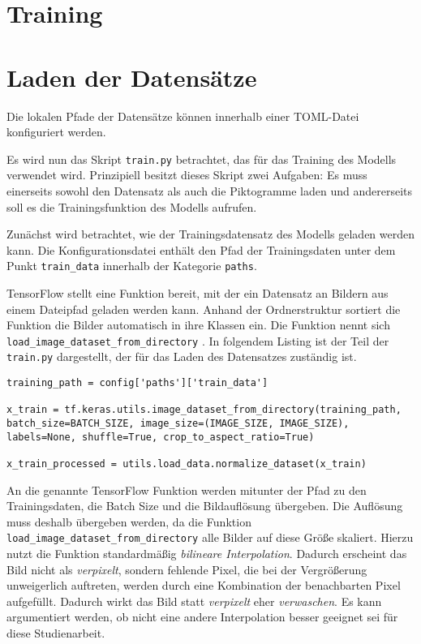 \section{Training}

\section{Laden der Datensätze}
Die lokalen Pfade der Datensätze können innerhalb einer \ac{TOML}-Datei konfiguriert werden. 


Es wird nun das Skript \lstinline{train.py} betrachtet, das für das Training des Modells verwendet wird. Prinzipiell besitzt dieses Skript zwei Aufgaben: Es muss einerseits sowohl den Datensatz als auch die Piktogramme laden und andererseits soll es die Trainingsfunktion des Modells aufrufen.

Zunächst wird betrachtet, wie der Trainingsdatensatz des Modells geladen werden kann. Die Konfigurationsdatei enthält den Pfad der Trainingsdaten unter dem Punkt \lstinline{train_data} innerhalb der Kategorie \lstinline{paths}.

TensorFlow stellt eine Funktion bereit, mit der ein Datensatz an Bildern aus einem Dateipfad geladen werden kann. Anhand der Ordnerstruktur sortiert die Funktion die Bilder automatisch in ihre Klassen ein. Die Funktion nennt sich \lstinline{load_image_dataset_from_directory} \cite{tf-keras-utils}. In folgendem Listing ist der Teil der \lstinline{train.py} dargestellt, der für das Laden des Datensatzes zuständig ist.

\begin{code}
   \label{code:train-set-laden}
   \begin{verbatim}
training_path = config['paths']['train_data']

x_train = tf.keras.utils.image_dataset_from_directory(training_path, batch_size=BATCH_SIZE, image_size=(IMAGE_SIZE, IMAGE_SIZE), labels=None, shuffle=True, crop_to_aspect_ratio=True)

x_train_processed = utils.load_data.normalize_dataset(x_train)
   \end{verbatim}
\end{code}

An die genannte TensorFlow Funktion werden mitunter der Pfad zu den Trainingsdaten, die Batch Size und die Bildauflösung übergeben. Die Auflösung muss deshalb übergeben werden, da die Funktion \lstinline{load_image_dataset_from_directory} alle Bilder auf diese Größe skaliert. Hierzu nutzt die Funktion standardmäßig \emph{bilineare Interpolation}. Dadurch erscheint das Bild nicht als \emph{verpixelt}, sondern fehlende Pixel, die bei der Vergrößerung unweigerlich auftreten, werden durch eine Kombination der benachbarten Pixel aufgefüllt. Dadurch wirkt das Bild statt \emph{verpixelt} eher \emph{verwaschen}. Es kann argumentiert werden, ob nicht eine andere Interpolation besser geeignet sei für diese Studienarbeit.

